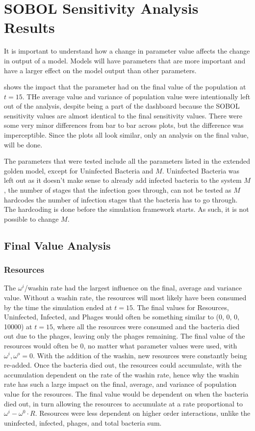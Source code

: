 \section{SOBOL Sensitivity Analysis Results}
\label{sec:SOBOL_sensitivity_analysis_results}
It is important to understand how a change in parameter value affects the change in output of a model. 
Models will have parameters that are more important and have a larger effect on the model output than other parameters. 

 shows the impact that the parameter had on the final value of the population at $t=15$. 
THe average value and variance of population value were intentionally left out of the analysis, despite being a part of the dashboard because the SOBOL sensitivity values are almost identical to the final sensitivity values. 
There were some very minor differences from bar to bar across plots, but the difference was imperceptible. 
Since the plots all look similar, only an analysis on the final value,  will be done. 

The parameters that were tested include all the parameters listed in the extended golden model, except for Uninfected Bacteria and $M$. 
Uninfected Bacteria was left out as it doesn't make sense to already add infected bacteria to the system
$M$, the number of stages that the infection goes through, can not be tested as $M$ hardcodes the number of infection stages that the bacteria has to go through. 
The hardcoding is done before the simulation framework starts. 
As such, it is not possible to change $M$. 

\subsection{Final Value Analysis}
\subsubsection{Resources}
The $\omega^i$/washin rate had the largest influence on the final, average and variance value. 
Without a washin rate, the resources will most likely have been consumed by the time the simulation ended at $t=15$. 
The final values for Resources, Uninfected, Infected, and Phages would often be something similar to (0, 0, 0, 10000) at $t=15$, where all the resources were consumed and the bacteria died out due to the phages, leaving only the phages remaining. 
The final value of the resources would often be 0, no matter what parameter values were used, with $\omega^i, \omega^o = 0$. 
With the addition of the washin, new resources were constantly being re-added. 
Once the bacteria died out, the resources could accumulate, with the accumulation dependent on the rate of the washin rate, hence why the washin rate has such a large impact on the final, average, and variance of population value for the resources. 
The final value would be dependent on when the bacteria died out, in turn allowing the resources to accumulate at a rate proportional to $\omega^i - \omega^0\cdot R$. 
Resources were less dependent on higher order interactions, unlike the uninfected, infected, phages, and total bacteria sum. 

